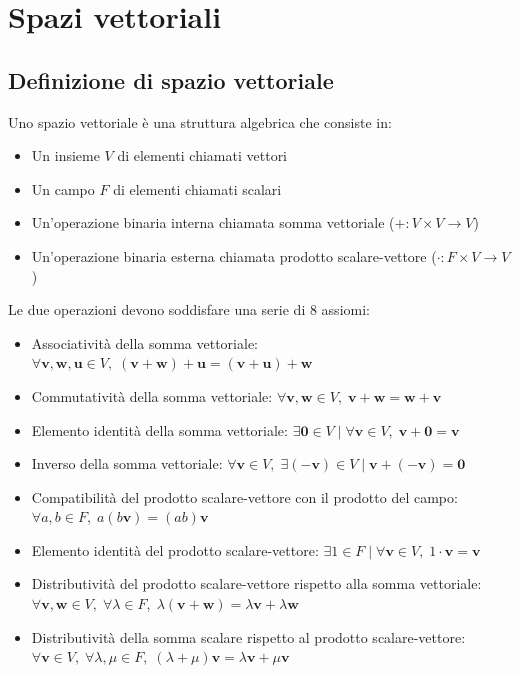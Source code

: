 \documentclass{article}
\begin{document}
\newpage
\section{Spazi vettoriali} \label{sec:vectorspaces}
\subsection{Definizione di spazio vettoriale} \label{subsec:vsdefiniton}
    Uno spazio vettoriale è una struttura algebrica che consiste in: 
    \begin{itemize}
        \item Un insieme $V$ di elementi chiamati vettori 
        \item Un campo $F$ di elementi chiamati scalari 
        \item Un'operazione binaria interna chiamata somma vettoriale ($+ : V \times V \rightarrow V$)
        \item Un'operazione binaria esterna chiamata prodotto scalare-vettore ($\cdot : F \times V \rightarrow V$)
    \end{itemize} 

    \vspace{10pt}
    Le due operazioni devono soddisfare una serie di 8 assiomi:
    \begin{itemize}
        \item Associatività della somma vettoriale: $ \forall \mathbf{v},\mathbf{w},\mathbf{u} \in V, \; (\mathbf{v} + \mathbf{w}) + \mathbf{u} = (\mathbf{v} + \mathbf{u}) + \mathbf{w} $  
        \item Commutatività della somma vettoriale: $ \forall \mathbf{v},\mathbf{w} \in V, \; \mathbf{v} + \mathbf{w} = \mathbf{w} + \mathbf{v} $
        \item Elemento identità della somma vettoriale: $ \exists \mathbf{0} \in V \; | \; \forall \mathbf{v} \in V,  \; \mathbf{v} + \mathbf{0} = \mathbf{v} $ 
        \item Inverso della somma vettoriale: $ \forall \mathbf{v} \in V, \; \exists (-\mathbf{v}) \in V \; | \; \mathbf{v} + (-\mathbf{v}) = \mathbf{0} $ 
        \item Compatibilità del prodotto scalare-vettore con il prodotto del campo: $ \forall a, b \in F, \;  a(b\mathbf{v}) = (ab)\mathbf{v} $
        \item Elemento identità del prodotto scalare-vettore: $ \exists 1 \in F \; | \; \forall \mathbf{v} \in V, \; 1 \cdot \mathbf{v} = \mathbf{v} $
        \item Distributività del prodotto scalare-vettore rispetto alla somma vettoriale: $ \forall \mathbf{v}, \mathbf{w} \in V, \; \forall \lambda \in F, \; \lambda(\mathbf{v} + \mathbf{w}) = \lambda\mathbf{v} + \lambda\mathbf{w}$
        \item Distributività della somma scalare rispetto al prodotto scalare-vettore: $ \forall \mathbf{v} \in V, \; \forall \lambda,\mu \in F, \; (\lambda + \mu)\mathbf{v} = \lambda\mathbf{v} + \mu\mathbf{v} $
    \end{itemize}
\end{document}

